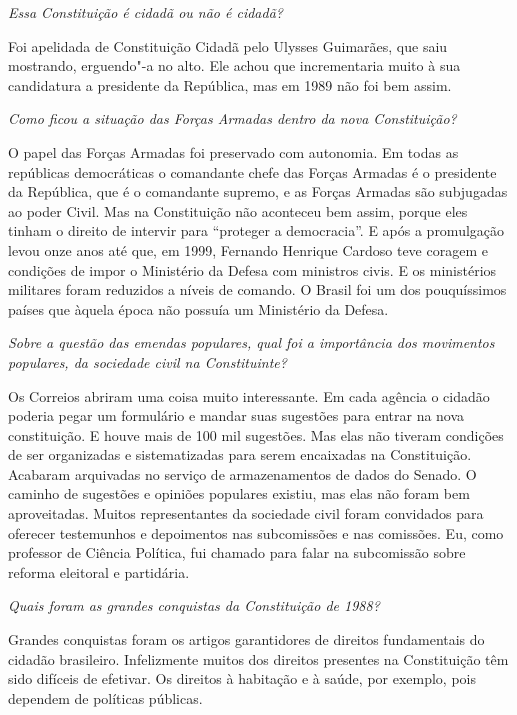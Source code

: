 \medskip

\noindent\emph{Essa Constituição é cidadã ou não é cidadã?}

Foi apelidada de Constituição Cidadã pelo Ulysses
Guimarães, que saiu mostrando, erguendo"-a no alto. Ele achou que
incrementaria muito à sua candidatura a presidente da República, mas em
1989 não foi bem assim.

\medskip

\noindent\emph{Como ficou a situação das Forças Armadas dentro da nova
Constituição?}

O papel das Forças Armadas foi preservado com
autonomia. Em todas as repúblicas democráticas o comandante chefe das
Forças Armadas é o presidente da República, que é o comandante supremo,
e as Forças Armadas são subjugadas ao poder Civil. Mas na Constituição
não aconteceu bem assim, porque eles tinham o direito de intervir para
``proteger a democracia''. E após a promulgação levou onze anos até que,
em 1999, Fernando Henrique Cardoso teve coragem e condições de impor o
Ministério da Defesa com ministros civis. E os ministérios militares
foram reduzidos a níveis de comando. O Brasil foi um dos pouquíssimos
países que àquela época não possuía um Ministério da Defesa.

\medskip

\noindent\emph{Sobre a questão das emendas populares, qual foi a importância
dos movimentos populares, da sociedade civil na Constituinte?}

Os Correios abriram uma coisa muito interessante. Em
cada agência o cidadão poderia pegar um formulário e mandar suas
sugestões para entrar na nova constituição. E houve mais de 100 mil
sugestões. Mas elas não tiveram condições de ser organizadas e
sistematizadas para serem encaixadas na Constituição. Acabaram
arquivadas no serviço de armazenamentos de dados do Senado. O caminho de
sugestões e opiniões populares existiu, mas elas não foram bem
aproveitadas. Muitos representantes da sociedade civil foram convidados
para oferecer testemunhos e depoimentos nas subcomissões e nas
comissões. Eu, como professor de Ciência Política, fui chamado para
falar na subcomissão sobre reforma eleitoral e partidária.

\medskip

\noindent\emph{Quais foram as grandes conquistas da Constituição de 1988?}

Grandes conquistas foram os artigos garantidores de
direitos fundamentais do cidadão brasileiro. Infelizmente muitos dos
direitos presentes na Constituição têm sido difíceis de efetivar. Os
direitos à habitação e à saúde, por exemplo, pois dependem de políticas
públicas.

